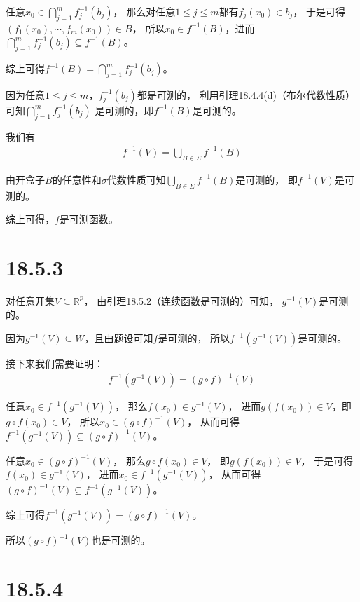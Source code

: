 \documentclass{article}
\begin{document}
任意$x_0 \in \bigcap\limits_{j=1}^m f_j^{-1}(b_j)$，
那么对任意$1 \leq j \leq m$都有$f_j(x_0) \in b_j$，
于是可得$(f_1(x_0), \cdots, f_m(x_0)) \in B$，
所以$x_0 \in f^{-1}(B)$，进而$\bigcap\limits_{j=1}^m f_j^{-1}(b_j) \subseteq f^{-1}(B)$。

综上可得$f^{-1}(B) = \bigcap\limits_{j=1}^m f_j^{-1}(b_j)$。

因为任意$1 \leq j \leq m$，$f_j^{-1}(b_j)$都是可测的，
利用引理18.4.4(d)（布尔代数性质）可知$\bigcap\limits_{j=1}^m f_j^{-1}(b_j)$
是可测的，即$f^{-1}(B)$是可测的。

我们有
\begin{align*}
  f^{-1}(V) = \bigcup\limits_{B \in \Sigma} f^{-1}(B)
\end{align*}

由开盒子$B$的任意性和$\sigma$代数性质可知$\bigcup\limits_{B \in \Sigma} f^{-1}(B)$是可测的，
即$f^{-1}(V)$是可测的。

综上可得，$f$是可测函数。

\section*{18.5.3}

对任意开集$V \subseteq \mathbb{R}^p$，
由引理18.5.2（连续函数是可测的）可知，
$g^{-1}(V)$是可测的。

因为$g^{-1}(V) \subseteq W$，且由题设可知$f$是可测的，
所以$f^{-1}(g^{-1}(V))$是可测的。

接下来我们需要证明：
\begin{align*}
  f^{-1}(g^{-1}(V)) = (g \circ f)^{-1}(V)
\end{align*}

任意$x_0 \in f^{-1}(g^{-1}(V))$，
那么$f(x_0) \in g^{-1}(V)$，
进而$g(f(x_0)) \in V$，即$g \circ f(x_0) \in V$，
所以$x_0 \in (g \circ f)^{-1}(V)$，
从而可得$f^{-1}(g^{-1}(V)) \subseteq (g \circ f)^{-1}(V)$。

任意$x_0 \in (g \circ f)^{-1}(V)$，
那么$g \circ f(x_0) \in V$，
即$g(f(x_0)) \in V$，
于是可得$f(x_0) \in g^{-1}(V)$，
进而$x_0 \in f^{-1}(g^{-1}(V))$，
从而可得$(g \circ f)^{-1}(V) \subseteq f^{-1}(g^{-1}(V))$。

综上可得$f^{-1}(g^{-1}(V)) = (g \circ f)^{-1}(V)$。

所以$(g \circ f)^{-1}(V)$也是可测的。

\section*{18.5.4}
\end{document}
